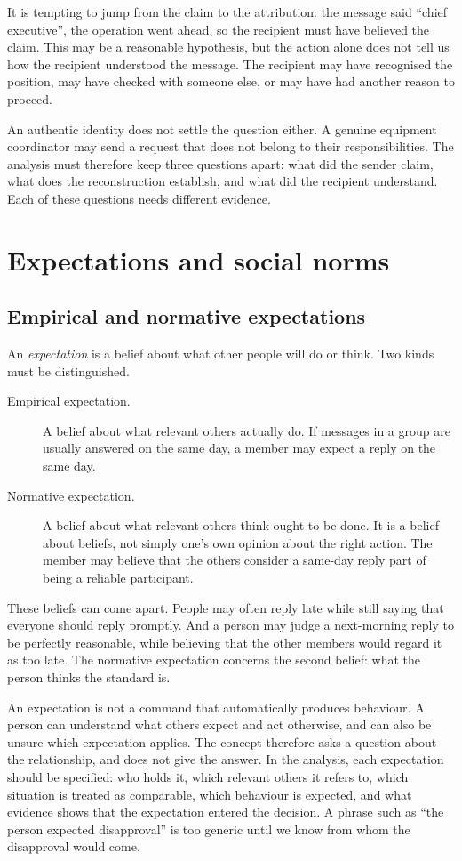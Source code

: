 It is tempting to jump from the claim to the attribution: the message said ``chief executive'', the operation went ahead, so the recipient must have believed the claim. This may be a reasonable hypothesis, but the action alone does not tell us how the recipient understood the message. The recipient may have recognised the position, may have checked with someone else, or may have had another reason to proceed.

An authentic identity does not settle the question either. A genuine equipment coordinator may send a request that does not belong to their responsibilities. The analysis must therefore keep three questions apart: what did the sender claim, what does the reconstruction establish, and what did the recipient understand. Each of these questions needs different evidence.

\section{Expectations and social norms}

\subsection{Empirical and normative expectations}
An \emph{expectation} is a belief about what other people will do or think. Two kinds must be distinguished.
\begin{description}
	\item[Empirical expectation.] A belief about what relevant others actually do. If messages in a group are usually answered on the same day, a member may expect a reply on the same day.
	\item[Normative expectation.] A belief about what relevant others think ought to be done. It is a belief about beliefs, not simply one's own opinion about the right action. The member may believe that the others consider a same-day reply part of being a reliable participant.
\end{description}

These beliefs can come apart. People may often reply late while still saying that everyone should reply promptly. And a person may judge a next-morning reply to be perfectly reasonable, while believing that the other members would regard it as too late. The normative expectation concerns the second belief: what the person thinks the standard is.

An expectation is not a command that automatically produces behaviour. A person can understand what others expect and act otherwise, and can also be unsure which expectation applies. The concept therefore asks a question about the relationship, and does not give the answer. In the analysis, each expectation should be specified: who holds it, which relevant others it refers to, which situation is treated as comparable, which behaviour is expected, and what evidence shows that the expectation entered the decision. A phrase such as ``the person expected disapproval'' is too generic until we know from whom the disapproval would come.

